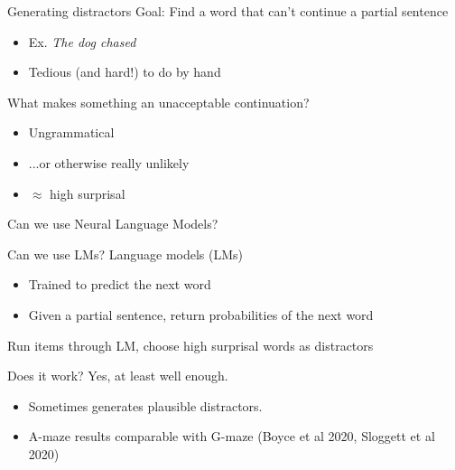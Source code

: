\documentclass[12pt, xcolor=beamer,table,usenames,dvipsnames, ignorenonframetext, ngerman,t]{beamer}
\begin{document}
%
\begin{frame}{Generating distractors}
\pause
Goal: Find a word that can't continue a partial sentence
\begin{itemize}
	\item Ex.  \textit{The dog chased} \pause
	\item Tedious (and hard!) to do by hand
\end{itemize} \pause

What makes something an unacceptable continuation? \pause
\begin{itemize}
	\item Ungrammatical \pause
	\item ...or otherwise really unlikely \pause 
	\item $\approx$ high surprisal 
\end{itemize} \pause

Can we use Neural Language Models?
\end{frame}
%
\begin{frame}{Can we use LMs?}
	\pause
Language models (LMs)
\begin{itemize}
	\item Trained to predict the next word
	\item Given a partial sentence, return probabilities of the next word
\end{itemize}\pause

Run items through LM, choose high surprisal words as distractors

%	
\end{frame}
%
\begin{frame}{Does it work?} 
\pause
{\large Yes, at least well enough.} \pause
\begin{itemize}
	\item Sometimes generates plausible distractors. \pause
	\item A-maze results comparable with G-maze {\small(Boyce et al 2020, Sloggett et al 2020)}
\end{itemize} 
\end{frame}
\end{document}
